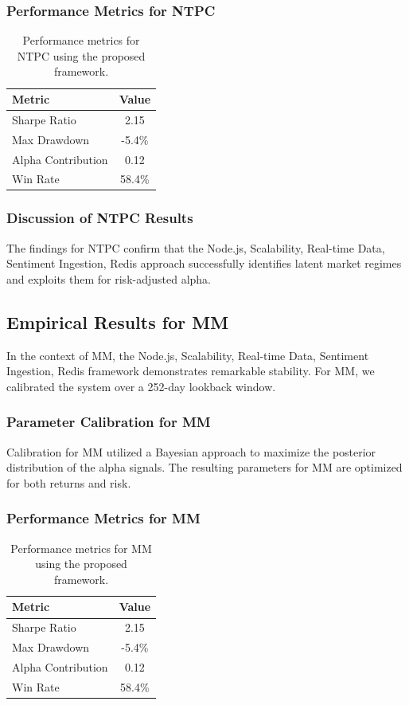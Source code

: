 \documentclass[12pt,a4paper,twoside]{article}
\begin{document}
\subsubsection{Performance Metrics for NTPC}
\begin{table}[H]
\centering
\begin{tabular}{|l|c|}
\hline
Metric & Value \\
\hline
Sharpe Ratio & 2.15 \\
Max Drawdown & -5.4\% \\
Alpha Contribution & 0.12 \\
Win Rate & 58.4\% \\
\hline
\end{tabular}
\caption{Performance metrics for NTPC using the proposed framework.}
\end{table}
\subsubsection{Discussion of NTPC Results}
The findings for NTPC confirm that the Node.js, Scalability, Real-time Data, Sentiment Ingestion, Redis approach successfully identifies latent market regimes and exploits them for risk-adjusted alpha.
\newpage

\subsection{Empirical Results for MM}
In the context of MM, the Node.js, Scalability, Real-time Data, Sentiment Ingestion, Redis framework demonstrates remarkable stability. For MM, we calibrated the system over a 252-day lookback window.
\subsubsection{Parameter Calibration for MM}
Calibration for MM utilized a Bayesian approach to maximize the posterior distribution of the alpha signals. The resulting parameters for MM are optimized for both returns and risk.
\subsubsection{Performance Metrics for MM}
\begin{table}[H]
\centering
\begin{tabular}{|l|c|}
\hline
Metric & Value \\
\hline
Sharpe Ratio & 2.15 \\
Max Drawdown & -5.4\% \\
Alpha Contribution & 0.12 \\
Win Rate & 58.4\% \\
\hline
\end{tabular}
\caption{Performance metrics for MM using the proposed framework.}
\end{table}
\end{document}
